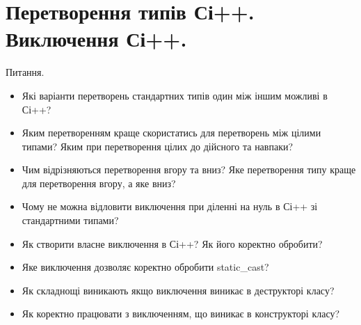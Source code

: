 \documentclass[]{article}
\begin{document}
\section{ Перетворення типів
Сі++. Виключення Сі++.}

Питання.
\begin{itemize}
\item
Які варіанти перетворень стандартних типів один між іншим можливі в
Сі++?
\item
Яким перетворенням краще скористатись для перетворень між цілими типами?
Яким при перетворення цілих до дійсного та навпаки?
\item
Чим відрізняються перетворення вгору та вниз? Яке перетворення типу
краще для перетворення вгору, а яке вниз?
\item
Чому не можна відловити виключення при діленні на нуль в Сі++ зі
стандартними типами?
\item
Як створити власне виключення в Сі++? Як його коректно обробити?
\item
Яке виключення дозволяє коректно обробити static\_cast?
\item
Як складнощі виникають якщо виключення виникає в деструкторі класу?
\item
Як коректно працювати з виключенням, що виникає в конструкторі класу?
\end{itemize}
\end{document}
